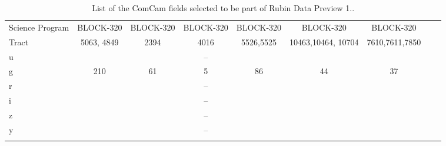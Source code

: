 \begin{table}
{\begin{tabular}{|l|c|c|c|c|c|c|c|c|}
Science Program  & BLOCK-320 &  BLOCK-320  &    BLOCK-320 &  BLOCK-320 &  BLOCK-320  &   BLOCK-320        \\  \arrayrulecolor{gray}\hline
Tract & 5063, 4849 &  2394  &    4016  & 5526,5525 &  10463,10464, 10704  &   7610,7611,7850        \\  \arrayrulecolor{gray}\hline
 u  &  &    &    --  &  &    &           \\  \arrayrulecolor{gray}\hline
 g & 210 & 61   &   5  & 86  & 44    &      37    \\  \arrayrulecolor{gray}\hline
 r &  &    &    --  &  &    &          \\  \arrayrulecolor{gray}\hline
 i &  &    &    --  &  &    &          \\  \arrayrulecolor{gray}\hline
 z &  &    &    --  &  &    &          \\  \arrayrulecolor{gray}\hline
 y &  &    &    --  &  &    &          \\  \arrayrulecolor{gray}\hline
 
 \arrayrulecolor{black}\hline
\end{tabular}}
\caption{List of the ComCam fields selected to be part of Rubin Data Preview 1..}
\label{tab:data-preview-1-fields}
\end{table}
